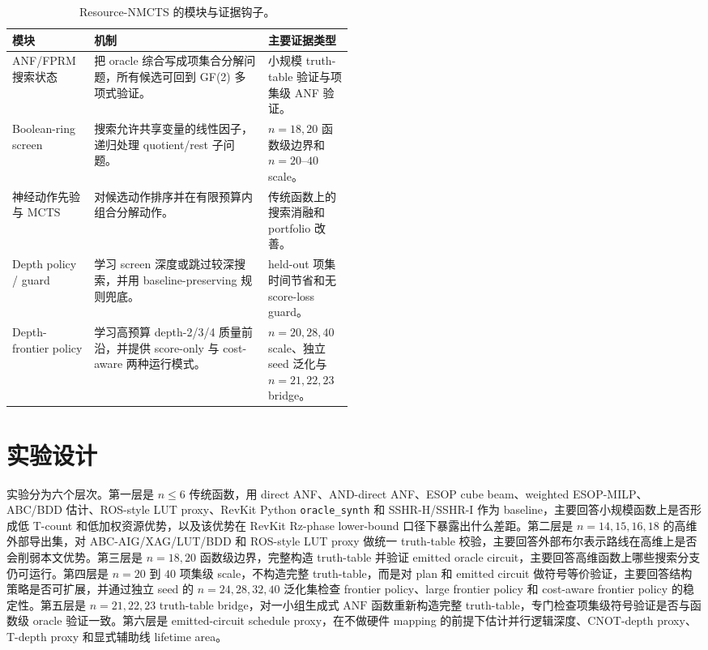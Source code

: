 \documentclass[UTF8,fontset=macnew,11pt]{ctexart}
\newcommand{\method}{Resource-NMCTS}
\newcommand{\anf}{\ensuremath{\mathrm{ANF}}}
\newcommand{\mcts}{\ensuremath{\mathrm{MCTS}}}
\newcommand{\ttable}{truth-table}
\begin{document}
\begin{table}[H]
\centering
\small
\caption{\method{} 的模块与证据钩子。}
\label{tab:modules}
\begin{tabularx}{\linewidth}{>{\raggedright\arraybackslash}p{0.24\linewidth}>{\raggedright\arraybackslash}X>{\raggedright\arraybackslash}p{0.25\linewidth}}
\toprule
模块 & 机制 & 主要证据类型 \\
\midrule
ANF/FPRM 搜索状态 & 把 oracle 综合写成项集合分解问题，所有候选可回到 GF(2) 多项式验证。 & 小规模 truth-table 验证与项集级 ANF 验证。 \\
Boolean-ring screen & 搜索允许共享变量的线性因子，递归处理 quotient/rest 子问题。 & $n=18,20$ 函数级边界和 $n=20$--$40$ scale。 \\
神经动作先验与 \mcts{} & 对候选动作排序并在有限预算内组合分解动作。 & 传统函数上的搜索消融和 portfolio 改善。 \\
Depth policy / guard & 学习 screen 深度或跳过较深搜索，并用 baseline-preserving 规则兜底。 & held-out 项集时间节省和无 score-loss guard。 \\
Depth-frontier policy & 学习高预算 depth-2/3/4 质量前沿，并提供 score-only 与 cost-aware 两种运行模式。 & $n=20,28,40$ scale、独立 seed 泛化与 $n=21,22,23$ bridge。 \\
\bottomrule
\end{tabularx}
\end{table}

\section{实验设计}

实验分为六个层次。第一层是 $n\leq6$ 传统函数，用 direct ANF、AND-direct ANF、ESOP cube beam、weighted ESOP-MILP、ABC/BDD 估计、ROS-style LUT proxy、RevKit Python \texttt{oracle\_synth} 和 SSHR-H/SSHR-I 作为 baseline，主要回答小规模函数上是否形成低 T-count 和低加权资源优势，以及该优势在 RevKit Rz-phase lower-bound 口径下暴露出什么差距。第二层是 $n=14,15,16,18$ 的高维外部导出集，对 ABC-AIG/XAG/LUT/BDD 和 ROS-style LUT proxy 做统一 truth-table 校验，主要回答外部布尔表示路线在高维上是否会削弱本文优势。第三层是 $n=18,20$ 函数级边界，完整构造 \ttable{} 并验证 emitted oracle circuit，主要回答高维函数上哪些搜索分支仍可运行。第四层是 $n=20$ 到 $40$ 项集级 scale，不构造完整 \ttable{}，而是对 plan 和 emitted circuit 做符号等价验证，主要回答结构策略是否可扩展，并通过独立 seed 的 $n=24,28,32,40$ 泛化集检查 frontier policy、large frontier policy 和 cost-aware frontier policy 的稳定性。第五层是 $n=21,22,23$ truth-table bridge，对一小组生成式 \anf{} 函数重新构造完整 \ttable{}，专门检查项集级符号验证是否与函数级 oracle 验证一致。第六层是 emitted-circuit schedule proxy，在不做硬件 mapping 的前提下估计并行逻辑深度、CNOT-depth proxy、T-depth proxy 和显式辅助线 lifetime area。
\end{document}
